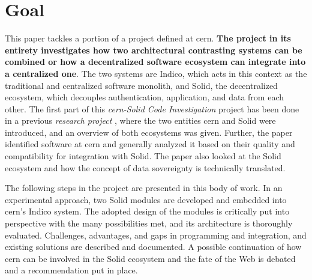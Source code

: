 \section{Goal}

This paper tackles a portion of a project defined at \gls{cern}. \textbf{The project in its entirety investigates how two architectural contrasting systems can be combined or how a decentralized software ecosystem can integrate into a centralized one}. The two systems are Indico, which acts in this context as the traditional and centralized software monolith, and Solid, the decentralized ecosystem, which decouples authentication, application, and data from each other. The first part of this \textit{\gls{cern}-Solid Code Investigation} project \cite{cern-solid-code-investigation-project-description} has been done in a previous \textit{research project} \cite{cern-solid-investigation-spec}, where the two entities \gls{cern} and Solid were introduced, and an overview of both ecosystems was given. Further, the paper identified software at \gls{cern} and generally analyzed it based on their quality and compatibility for integration with Solid. The paper also looked at the Solid ecosystem and how the concept of data sovereignty is technically translated.

The following steps in the project are presented in this body of work. In an experimental approach, two Solid modules are developed and embedded into \gls{cern}'s Indico system. The adopted design of the modules is critically put into perspective with the many possibilities met, and its architecture is thoroughly evaluated. Challenges, advantages, and gaps in programming and integration, and existing solutions are described and documented. A possible continuation of how \gls{cern} can be involved in the Solid ecosystem and the fate of the Web is debated and a recommendation put in place.
